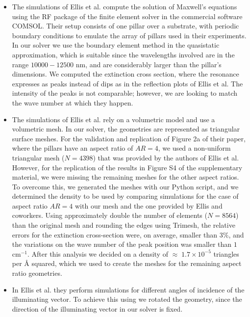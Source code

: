 \begin{itemize}

\item {The simulations of Ellis et al. compute the solution of Maxwell's equations using the RF package
of the finite element solver in the commercial software COMSOL. Their setup consists of one pillar over a 
substrate, with periodic boundary conditions to emulate the array of pillars used in their experiments. In our 
solver we use the boundary element method in the quasistatic approximation, which is suitable since the wavelengths
involved are in the range $10000-12500$ nm, and are considerably larger than the pillar's dimensions. We computed 
the extinction cross section, where the resonance expresses as peaks instead of dips as in the reflection plots of 
Ellis et al. The intensity of the peaks is not comparable; however, we are looking to match the wave number at which
they happen.}

\item {The simulations of Ellis et al. rely on a volumetric model and use a volumetric mesh. In our 
solver, the geometries are represented as triangular surface meshes. For the validation and replication of Figure 2a of 
their paper, where the pillars have an aspect ratio of $AR=4$, we used a non-uniform triangular mesh ($N=4398$) that 
was provided by the authors of Ellis et al. However, for the replication of the results in Figure S4 of the supplementary material, 
we were missing the remaining meshes for the other aspect ratios. To overcome this, we generated the meshes with our Python 
script, and we determined the density to be used by comparing simulations for the case of aspect ratio $AR=4$ with our mesh and 
the one provided by Ellis and coworkers. Using approximately double the number of elements ($N=8564$) than the original mesh 
and rounding the edges using Trimesh, the relative errors for the extinction cross-section were, on average, smaller than 
$3\%$, and the variations on the wave number of the peak position was smaller than $1$ cm$^{-1}$. After this analysis we 
decided on a density of $\approx \; 1.7 \times10^{-5}$ triangles per $\text{\AA}$ squared, which we used to create the meshes
for the remaining aspect ratio geometries.}

\item {In Ellis et al. they perform simulations for different angles of incidence of the illuminating vector. To achieve this 
using \pygbe we rotated the geometry, since the direction of the illuminating vector in our solver is fixed.}
\end{itemize}

